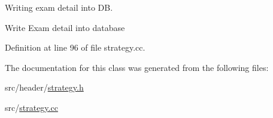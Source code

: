 Writing exam detail into D\-B. 

Write Exam detail into database 

Definition at line 96 of file strategy.\-cc.



The documentation for this class was generated from the following files\-:\begin{DoxyCompactItemize}
\item 
src/header/\hyperlink{strategy_8h}{strategy.\-h}\item 
src/\hyperlink{strategy_8cc}{strategy.\-cc}\end{DoxyCompactItemize}

